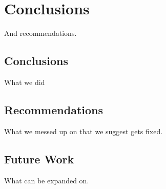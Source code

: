 \chapter{Conclusions}
And recommendations.
\section{Conclusions}
What we did
\section{Recommendations}
What we messed up on that we suggest gets fixed.
\section{Future Work}
What can be expanded on.